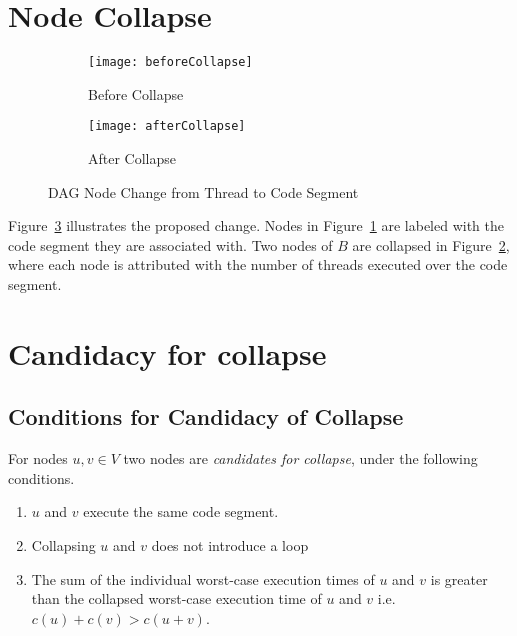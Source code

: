 \section{Node Collapse}


\begin{figure}
  \centering
  \begin{subfigure}[b]{0.4\textwidth}{
      \texttt{[image: beforeCollapse]}
      \caption{Before Collapse}
      \label{fig:before-collapse}
    }
  \end{subfigure} \quad
  \begin{subfigure}[b]{0.4\textwidth}{
      \texttt{[image: afterCollapse]}
      \caption{After Collapse}
      \label{fig:after-collapse}
    }
  \end{subfigure}
  \caption{DAG Node Change from Thread to Code Segment}
  \label{fig:dag-collapse}
\end{figure}



Figure~\ref{fig:dag-collapse} illustrates the proposed change. Nodes in
Figure~\ref{fig:before-collapse} are labeled with the code segment
they are associated with. Two nodes of ${B}$ are collapsed in
Figure~\ref{fig:after-collapse}, where each node is attributed with
the number of threads executed over the code segment.


\section{Candidacy for collapse}

\subsection{Conditions for Candidacy of Collapse}
For nodes ${u,v \in V}$ two nodes are \emph{candidates for collapse},
under the following conditions.
\begin{enumerate}
  \item ${u}$ and ${v}$ execute the same code segment.
  \item Collapsing ${u}$ and ${v}$ does not introduce a loop
  \item The sum of the individual worst-case execution times of ${u}$
    and ${v}$ is greater than the collapsed worst-case execution time
    of ${u}$ and ${v}$ i.e. ${c(u) + c(v) > c(u + v)}$.
\end{enumerate}

